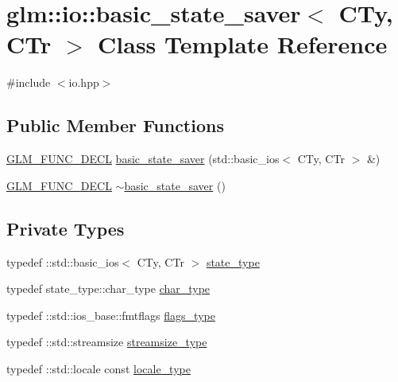 \hypertarget{classglm_1_1io_1_1basic__state__saver}{}\section{glm\+:\+:io\+:\+:basic\+\_\+state\+\_\+saver$<$ C\+Ty, C\+Tr $>$ Class Template Reference}
\label{classglm_1_1io_1_1basic__state__saver}


{\ttfamily \#include $<$io.\+hpp$>$}

\subsection*{Public Member Functions}
\begin{DoxyCompactItemize}
\item 
\mbox{\hyperlink{setup_8hpp_ab2d052de21a70539923e9bcbf6e83a51}{G\+L\+M\+\_\+\+F\+U\+N\+C\+\_\+\+D\+E\+CL}} \mbox{\hyperlink{classglm_1_1io_1_1basic__state__saver_ab31652b0b7f2a24fa8f9fda2505de356}{basic\+\_\+state\+\_\+saver}} (std\+::basic\+\_\+ios$<$ C\+Ty, C\+Tr $>$ \&)
\item 
\mbox{\hyperlink{setup_8hpp_ab2d052de21a70539923e9bcbf6e83a51}{G\+L\+M\+\_\+\+F\+U\+N\+C\+\_\+\+D\+E\+CL}} \mbox{\hyperlink{classglm_1_1io_1_1basic__state__saver_ad89569bbaec5d7fe08d40dbac5abbb53}{$\sim$basic\+\_\+state\+\_\+saver}} ()
\end{DoxyCompactItemize}
\subsection*{Private Types}
\begin{DoxyCompactItemize}
\item 
typedef \+::std\+::basic\+\_\+ios$<$ C\+Ty, C\+Tr $>$ \mbox{\hyperlink{classglm_1_1io_1_1basic__state__saver_a84787cc03192543bfe67ef25e7f20aa6}{state\+\_\+type}}
\item 
typedef state\+\_\+type\+::char\+\_\+type \mbox{\hyperlink{classglm_1_1io_1_1basic__state__saver_ae6abb8e2e6bd4a044e953746691ffe8e}{char\+\_\+type}}
\item 
typedef \+::std\+::ios\+\_\+base\+::fmtflags \mbox{\hyperlink{classglm_1_1io_1_1basic__state__saver_a73ca8320543524c7ab7f1ce97d30aff6}{flags\+\_\+type}}
\item 
typedef \+::std\+::streamsize \mbox{\hyperlink{classglm_1_1io_1_1basic__state__saver_a0a4c44df9a4fcf7531af6da7698e0931}{streamsize\+\_\+type}}
\item 
typedef \+::std\+::locale const \mbox{\hyperlink{classglm_1_1io_1_1basic__state__saver_acc657f13df9c1fd68e1014b96ff615cb}{locale\+\_\+type}}
\end{DoxyCompactItemize}
